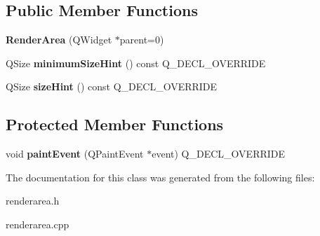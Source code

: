 \subsection*{Public Member Functions}
\begin{DoxyCompactItemize}
\item 
\mbox{\label{class_render_area_a2e337a64fb1f619e6c63832bd1027f99}} 
{\bfseries Render\+Area} (Q\+Widget $\ast$parent=0)
\item 
\mbox{\label{class_render_area_a9df5bc259ad4238f208bfd4657b9afab}} 
Q\+Size {\bfseries minimum\+Size\+Hint} () const Q\+\_\+\+D\+E\+C\+L\+\_\+\+O\+V\+E\+R\+R\+I\+DE
\item 
\mbox{\label{class_render_area_a3c8c7860b578b7b0114656383c69f149}} 
Q\+Size {\bfseries size\+Hint} () const Q\+\_\+\+D\+E\+C\+L\+\_\+\+O\+V\+E\+R\+R\+I\+DE
\end{DoxyCompactItemize}
\subsection*{Protected Member Functions}
\begin{DoxyCompactItemize}
\item 
\mbox{\label{class_render_area_ac7463f6acc32ec6a1e6e494e19297892}} 
void {\bfseries paint\+Event} (Q\+Paint\+Event $\ast$event) Q\+\_\+\+D\+E\+C\+L\+\_\+\+O\+V\+E\+R\+R\+I\+DE
\end{DoxyCompactItemize}


The documentation for this class was generated from the following files\+:\begin{DoxyCompactItemize}
\item 
renderarea.\+h\item 
renderarea.\+cpp\end{DoxyCompactItemize}
